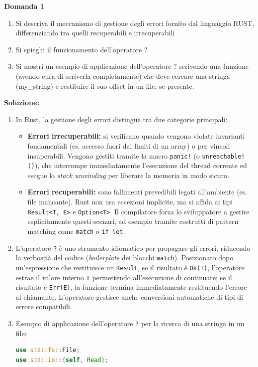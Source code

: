 \begin{exambox}
\textbf{Domanda 1}
\begin{enumerate}
    \item Si descriva il meccanismo di gestione degli errori fornito dal linguaggio RUST, differenziando tra quelli recuperabili e irrecuperabili
    \item Si spieghi il funzionamento dell'operatore ?
    \item Si mostri un esempio di applicazione dell'operatore ? scrivendo una funzione (avendo cura di scriverla completamente) che deve cercare una stringa (my\_string) e restituire il suo offset in un file, se presente.
\end{enumerate}

\textbf{Soluzione:}
\begin{enumerate}
    \item In Rust, la gestione degli errori distingue tra due categorie principali:
    \begin{itemize}
        \item \textbf{Errori irrecuperabili:} si verificano quando vengono violate invarianti fondamentali (es. accesso fuori dai limiti di un array) o per vincoli insuperabili. Vengono gestiti tramite la macro \texttt{panic!} (o \texttt{unreachable!()}), che interrompe immediatamente l'esecuzione del thread corrente ed esegue lo \textit{stack unwinding} per liberare la memoria in modo sicuro.
        \item \textbf{Errori recuperabili:} sono fallimenti prevedibili legati all'ambiente (es. file mancante). Rust non usa eccezioni implicite, ma si affida ai tipi \texttt{Result<T, E>} e \texttt{Option<T>}. Il compilatore forza lo sviluppatore a gestire esplicitamente questi scenari, ad esempio tramite costrutti di pattern matching come \texttt{match} o \texttt{if let}.
    \end{itemize}
    \item L'operatore \texttt{?} è uno strumento idiomatico per propagare gli errori, riducendo la verbosità del codice (\textit{boilerplate} dei blocchi \texttt{match}). Posizionato dopo un'espressione che restituisce un \texttt{Result}, se il risultato è \texttt{Ok(T)}, l'operatore estrae il valore interno \texttt{T} permettendo all'esecuzione di continuare; se il risultato è \texttt{Err(E)}, la funzione termina immediatamente restituendo l'errore al chiamante. L'operatore gestisce anche conversioni automatiche di tipi di errore compatibili.
    \item Esempio di applicazione dell'operatore \texttt{?} per la ricerca di una stringa in un file:
\begin{lstlisting}[language=Rust]
use std::fs::File;
use std::io::{self, Read};


\end{lstlisting}
\end{enumerate}
\end{exambox}
